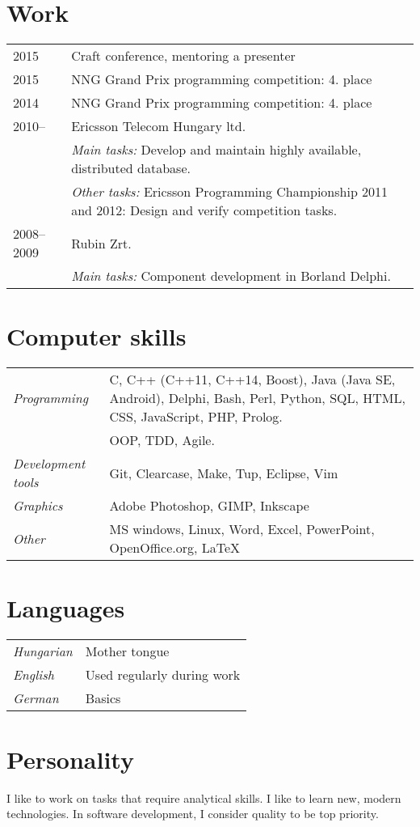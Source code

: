 \documentclass[a4paper,10pt]{article}
\newcommand{\pont}[1]{\emph{#1}}
\begin{document}
\section*{Work}
\begin{tabular}{lp{10cm}}
 2015&Craft conference, mentoring a presenter\\
 2015&NNG Grand Prix programming competition: 4. place\\
 2014&NNG Grand Prix programming competition: 4. place\\
 2010--&Ericsson Telecom Hungary ltd.\\
  &\emph{Main tasks:} Develop and maintain highly available, distributed database.\\
  &\emph{Other tasks:} Ericsson Programming Championship 2011 and 2012: Design and verify competition tasks.\\
 2008--2009&Rubin Zrt.\\
  &\emph{Main tasks:} Component development in Borland Delphi.
\end{tabular}

\section*{Computer skills}
\begin{tabular}{lp{12cm}}
 \pont{Programming}&C, C++ (C++11, C++14, Boost), Java (Java SE, Android), Delphi, Bash, Perl, Python, SQL, HTML, CSS, JavaScript, PHP, Prolog.\\
 &OOP, TDD, Agile.\\
 \pont{Development tools}&Git, Clearcase, Make, Tup, Eclipse, Vim\\
 \pont{Graphics}&Adobe Photoshop, GIMP, Inkscape\\
 \pont{Other}&MS windows, Linux, Word, Excel, PowerPoint, OpenOffice.org, LaTeX
\end{tabular}

\section*{Languages}
\begin{tabular}{ll}
 \pont{Hungarian}&Mother tongue\\
 \pont{English}&Used regularly during work\\
 \pont{German}&Basics
\end{tabular}

\section*{Personality}
I like to work on tasks that require analytical skills. I like to learn new, modern technologies. In software development, I consider quality to be top priority.
\end{document}
